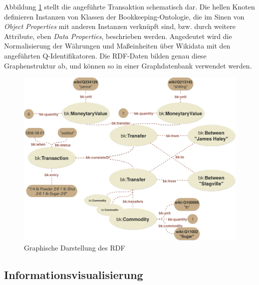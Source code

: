 \documentclass[12pt,a4paper]{article}
\begin{document}
Abbildung \ref{fig:example} stellt die angeführte Transaktion schematisch dar. Die hellen Knoten definieren Instanzen von Klassen der Bookkeeping-Ontologie, die im Sinen von \textit{Object Properties} mit anderen Instanzen verknüpft sind, bzw. durch weitere Attribute, eben \textit{Data Properties}, beschrieben werden. Angedeutet wird die Normalisierung der Währungen und Maßeinheiten über Wikidata mit den angeführten Q-Identifikatoren. Die RDF-Daten bilden genau diese Graphenstruktur ab, und können so in einer Graphdatenbank verwendet werden.  

\begin{figure}[H]
\centering
	\includegraphics[width=1\textwidth]{img/example.png}  
    \caption[Graphische Darstellung des RDF, eigene Darstellung, 01.06.2019.]{Graphische Darstellung des RDF} \label{fig:example}
\end{figure}


\newpage
\subsection{Informationsvisualisierung}
\end{document}
